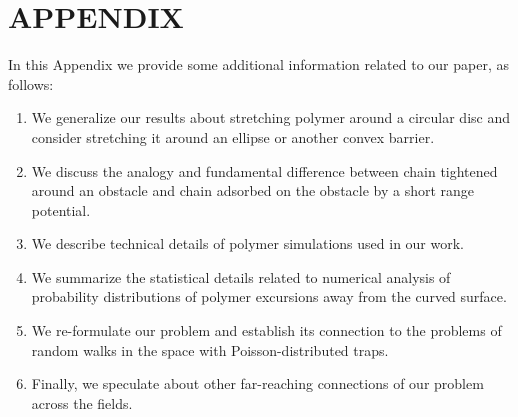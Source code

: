 \documentclass[aps,pre,floatfix,twocolumn,nofootinbib]{revtex4-2}
\begin{document}

\renewcommand{\theequation}{A-\arabic{equation}}
\renewcommand{\thefigure}{A\arabic{figure}}
\renewcommand{\thesection}{A\arabic{section}}

\setcounter{equation}{0}  %
\setcounter{figure}{0}  %
\setcounter{section}{0}


\section*{APPENDIX}  %




In this Appendix we provide some additional information related to our paper, as follows:  \begin{enumerate} \item We generalize our results about stretching polymer around a circular disc and consider stretching it around an ellipse or another convex barrier.  \item We discuss the analogy and fundamental difference between chain tightened around an obstacle and chain adsorbed on the obstacle by a short range potential.  \item  We describe technical details of polymer simulations used in our work.  \item We summarize the statistical details related to numerical analysis of probability distributions of polymer excursions away from the curved surface.  \item We re-formulate our problem and establish its connection to the problems of random walks in the space with Poisson-distributed traps.  \item Finally, we speculate about other far-reaching connections of our problem across the fields.  \end{enumerate}
 
\end{document}
